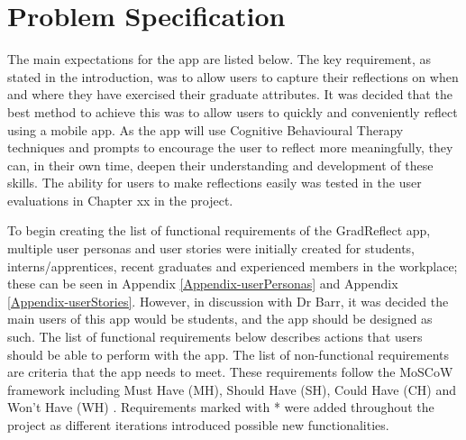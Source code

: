 \documentclass{l4proj}
\begin{document}
\section{Problem Specification}

The main expectations for the app are listed below. The key requirement, as stated in the introduction, was to allow users to capture their reflections on when and where they have exercised their graduate attributes. It was decided that the best method to achieve this was to allow users to quickly and conveniently reflect using a mobile app. As the app will use Cognitive Behavioural Therapy techniques and prompts to encourage the user to reflect more meaningfully, they can, in their own time, deepen their understanding and development of these skills. The ability for users to make reflections easily was tested in the user evaluations in Chapter xx in the project. 

To begin creating the list of functional requirements of the GradReflect app, multiple user personas and user stories were initially created for students, interns/apprentices, recent graduates and experienced members in the workplace; these can be seen in Appendix \ref{Appendix-userPersonas} and Appendix \ref{Appendix-userStories}. However, in discussion with Dr Barr, it was decided the main users of this app would be students, and the app should be designed as such. The list of functional requirements below describes actions that users should be able to perform with the app. The list of non-functional requirements are criteria that the app needs to meet. These requirements follow the MoSCoW framework including Must Have (MH), Should Have (SH), Could Have (CH) and Won’t Have (WH) \citep{consortium_chapter_2014}. Requirements marked with * were added throughout the project as different iterations introduced possible new functionalities.
\end{document}
